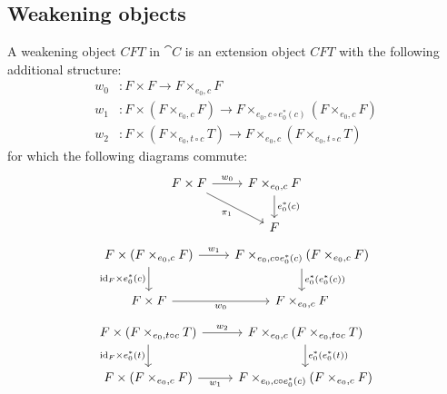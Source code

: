 \subsection{Weakening objects}
\begin{defn}
A weakening object $CFT$ in $\cat{C}$ is an extension object $CFT$ with the
following additional structure:
\begin{align*}
w_0 & : F\times F\to F\times_{e_0,c} F\\
w_1 & : F\times(F\times_{e_0,c} F) \to F\times_{e_0,c \circ e_0^\ast(c)} (F\times_{e_0,c}F)\\
w_2 & : F\times(F\times_{e_0,t\circ c} T) \to F\times_{e_0,c}(F\times_{e_0,t\circ c} T)
\end{align*}
for which the following diagrams commute:
\begin{equation*}
\begin{tikzcd}
F\times F \ar{r}{w_0} \ar{dr}[swap]{\pi_1} & F\times_{e_0,c}F \ar{d}{e_0^\ast(c)}\\
& F
\end{tikzcd}
\end{equation*}
\begin{equation*}
\begin{tikzcd}
F\times(F\times_{e_0,c} F) 
  \ar{d}[swap]{\catid{F}\times e_0^\ast(c)}
  \ar{r}{w_1}
  &
F\times_{e_0,c\circ e_0^\ast(c)} (F\times_{e_0,c}F)
  \ar{d}{e_0^\ast(e_0^\ast(c))}
  \\
F\times F
  \ar{r}[swap]{w_0}
  &
F\times_{e_0,c} F
\end{tikzcd}
\end{equation*}
\begin{equation*}
\begin{tikzcd}
F\times(F\times_{e_0,t\circ c} T)
  \ar{r}{w_2}
  \ar{d}[swap]{\catid{F}\times e_0^\ast(t)}
  &
F\times_{e_0,c}(F\times_{e_0,t\circ c} T)
  \ar{d}{e_0^\ast(e_0^\ast(t))}
  \\
F\times(F\times_{e_0,c} F)
  \ar{r}[swap]{w_1}
  &
F\times_{e_0,c\circ e_0^\ast(c)} (F\times_{e_0,c}F)
\end{tikzcd}
\end{equation*}
\end{defn}
